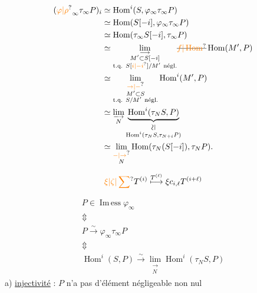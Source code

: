 \[
\begin{aligned}
(\unsure{\varphi|\rho}_\infty\tau_\infty P)_{i}
 &\simeq\operatorname{Hom}^i(S,\varphi_\infty\tau_\infty P)\\
 &\simeq\operatorname{Hom}(S[-i],\varphi_\infty\tau_\infty P)\\
 &\simeq\operatorname{Hom}(\tau_\infty S[-i],\tau_\infty P)\\
 &\simeq\underset{\substack{\longrightarrow\\M'\subset S[-i]\\\text{t.q. }S[\unsure{i|-i}]/M'\ \text{négl.}}}{\lim}
 \deleted{\unsure{f|\operatorname{Hom}}}\operatorname{Hom}(M',P)\\
 &\simeq\underset{\substack{\unsure{\rightarrow|-}\\M'\subset S\\\text{t.q. } S/M'\ \text{négl.}}}{\lim}\operatorname{Hom}^i(M',P)\\
 &\simeq\underset{\substack{\longrightarrow\\N}}{\lim}
 \underbrace{\operatorname{Hom}^i(\tau_N S,P)}_{\substack{\rotatebox{90}{$\simeq$}\\\operatorname{Hom}^i(\tau_N S,\tau_{N+i}P)}}\\
 &\simeq\underset{\substack{\unsure{-|\rightarrow}\\N}}{\lim}\operatorname{Hom}(\tau_N(S[-i]),\tau_N P).
\end{aligned}
\]

\[
\unsure{\xi|\zeta|\sum}T^{(i)}\overset{T^{(\ell)}}{\longmapsto}\xi c_{i,\ell}T^{(i+\ell)}
\]

\[
\begin{gathered}
P\in\operatorname{Im\,ess}\varphi_\infty\\
\Updownarrow\\
P\xrightarrow{\sim}\varphi_\infty\tau_\infty P\\
\Updownarrow\\
\operatorname{Hom}^i(S,P)\xrightarrow{\sim}\underset{\substack{\longrightarrow\\N}}{\lim}\operatorname{Hom}^i(\tau_N S,P)
\end{gathered}
\]
a) \uline{injectivité} : $P$ n'a pas d'élément négligeable non nul

